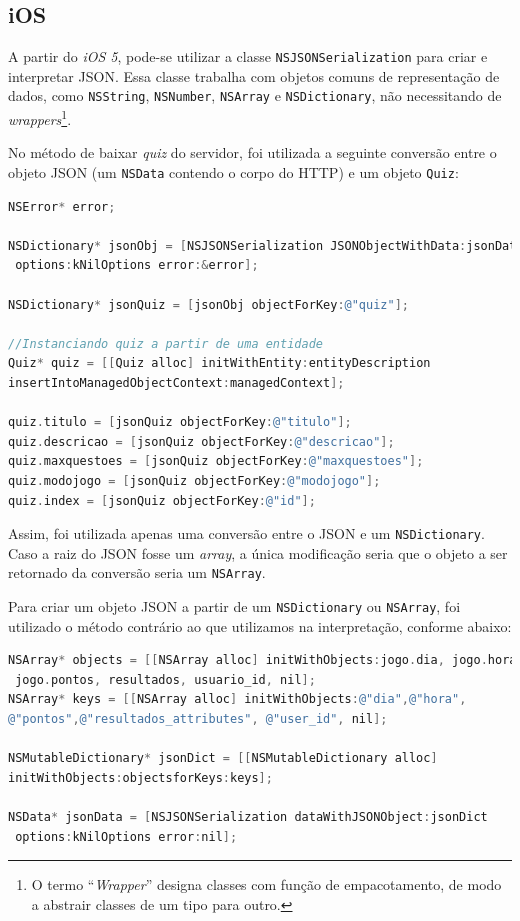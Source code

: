 	\subsection{iOS}
            A partir do \emph{iOS 5}, pode-se utilizar a classe \texttt{NSJSONSerialization} para criar e interpretar \ac{JSON}. Essa classe trabalha com objetos comuns de representação de dados, como \texttt{NSString}, \texttt{NSNumber}, \texttt{NSArray} e \texttt{NSDictionary}, não necessitando de \emph{wrappers}\footnote{O termo ``\emph{Wrapper}'' designa classes com função de empacotamento, de modo a abstrair classes de um tipo para outro.}.
            
			No método de baixar \emph{quiz} do servidor, foi utilizada a seguinte conversão entre o objeto \ac{JSON} (um \texttt{NSData} contendo o corpo do \ac{HTTP}) e um objeto \texttt{Quiz}:
\begin{lstlisting}[language=C]   
NSError* error;
     
NSDictionary* jsonObj = [NSJSONSerialization JSONObjectWithData:jsonData
 options:kNilOptions error:&error];
     
NSDictionary* jsonQuiz = [jsonObj objectForKey:@"quiz"];
     
//Instanciando quiz a partir de uma entidade
Quiz* quiz = [[Quiz alloc] initWithEntity:entityDescription 
insertIntoManagedObjectContext:managedContext];
     
quiz.titulo = [jsonQuiz objectForKey:@"titulo"];
quiz.descricao = [jsonQuiz objectForKey:@"descricao"];
quiz.maxquestoes = [jsonQuiz objectForKey:@"maxquestoes"];
quiz.modojogo = [jsonQuiz objectForKey:@"modojogo"];
quiz.index = [jsonQuiz objectForKey:@"id"];
 \end{lstlisting}       
            
			Assim, foi utilizada apenas uma conversão entre o \ac{JSON} e um \texttt{NSDictionary}. Caso a raiz do \ac{JSON} fosse um \emph{array}, a única modificação seria que o objeto a ser retornado da conversão seria um \texttt{NSArray}.
            
			Para criar um objeto \ac{JSON} a partir de um \texttt{NSDictionary} ou \texttt{NSArray}, foi utilizado o método contrário ao que utilizamos na interpretação, conforme abaixo:
\begin{lstlisting}[language=C]   
NSArray* objects = [[NSArray alloc] initWithObjects:jogo.dia, jogo.hora,
 jogo.pontos, resultados, usuario_id, nil];
NSArray* keys = [[NSArray alloc] initWithObjects:@"dia",@"hora",
@"pontos",@"resultados_attributes", @"user_id", nil];
     
NSMutableDictionary* jsonDict = [[NSMutableDictionary alloc] 
initWithObjects:objectsforKeys:keys];
     
NSData* jsonData = [NSJSONSerialization dataWithJSONObject:jsonDict
 options:kNilOptions error:nil];
 \end{lstlisting}       
